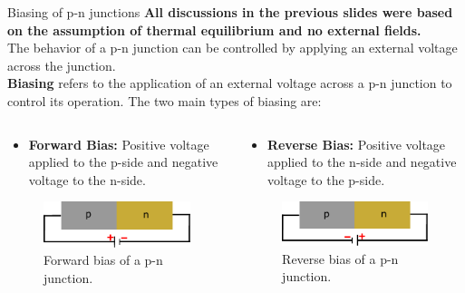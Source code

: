 \begin{frame}{Biasing of p-n junctions}
	\textbf{All discussions in the previous slides were based on the assumption of thermal equilibrium and no external fields.} \\
	The behavior of a p-n junction can be controlled by applying an external voltage across the junction. \\
	\textbf{Biasing} refers to the application of an external voltage across a p-n junction to control its operation. The two main types of biasing are:
	\begin{columns}
		\begin{column}{0.5\textwidth}
			\begin{itemize}
				\item \textbf{Forward Bias:} Positive voltage applied to the p-side and negative voltage to the n-side.
			\end{itemize}
			\begin{figure}
				\centering
				\includegraphics[scale=1]{fig/lec03/pn_forward_bias.pdf}
				\caption{Forward bias of a p-n junction.}
				\label{fig:forward_bias_pn_junction}
			\end{figure}
		\end{column}
		\begin{column}{0.5\textwidth}
			\begin{itemize}
				\item \textbf{Reverse Bias:} Positive voltage applied to the n-side and negative voltage to the p-side.
			\end{itemize}
			\begin{figure}
				\centering
				\includegraphics[scale=1]{fig/lec03/pn_reverse_bias.pdf}
				\caption{Reverse bias of a p-n junction.}
				\label{fig:reverse_bias_pn_junction}
			\end{figure}
		\end{column}
	\end{columns}
\end{frame}

